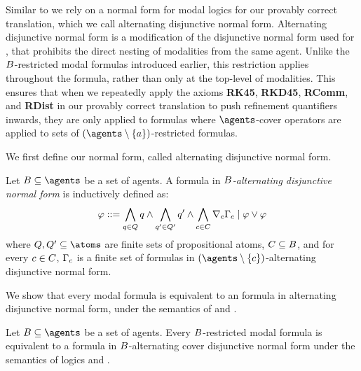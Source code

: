 Similar to \axiomRmlK{} we rely on a normal form for modal logics for our provably correct translation, which we call alternating disjunctive normal form.
Alternating disjunctive normal form is a modification of the disjunctive normal form used for \axiomRmlK{}, that prohibits the direct nesting of modalities from the same agent.
Unlike the $B$-restricted modal formulas introduced earlier, this restriction applies throughout the formula, rather than only at the top-level of modalities.
This ensures that when we repeatedly apply the axioms {\bf RK45}, {\bf RKD45}, {\bf RComm}, and {\bf RDist} in our provably correct translation to push refinement quantifiers inwards, they are only applied to formulas where $\agents$-cover operators are applied to sets of $(\agents \setminus \{\agentA\})$-restricted formulas.

We first define our normal form, called alternating disjunctive normal form.

\begin{definition}
Let $\agentsB \subseteq \agents$ be a set of agents.
A formula in {\em $B$-alternating disjunctive normal form} is inductively defined as:
$$
\varphi ::= \bigwedge_{q \in Q} q \land \bigwedge_{q' \in Q'} q' \land \bigwedge_{c \in C} \nabla_{c} \Gamma_c \mid \varphi \lor \varphi
$$
where $\atomsQ, \atomsQ' \subseteq \atoms$ are finite sets of propositional atoms, $C \subseteq B$, and for every $c \in C$, $\Gamma_c$ is a finite set of formulas in $(\agents \setminus \{\agentC\})$-alternating disjunctive normal form.
\end{definition}

We show that every modal formula is equivalent to an formula in alternating disjunctive normal form, under the semantics of \logicKFF{} and \logicKD{}. 

\begin{lemma}\label{adnf-equivalent}
Let $\agentsB \subseteq \agents$ be a set of agents.
Every $B$-restricted modal formula is equivalent to a formula in $B$-alternating cover disjunctive normal form under the semantics of logics \logicKFF{} and \logicKD{}.
\end{lemma}


